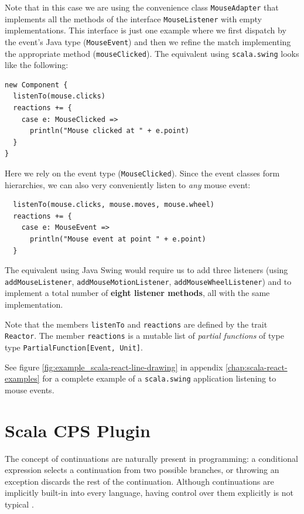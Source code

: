 Note that in this case we are using the convenience class \texttt{Mouse\-Adapter} that implements all the methods of the interface \texttt{Mouse\-Listener} with empty implementations. This interface is just one example where we first dispatch by the event's Java type (\texttt{MouseEvent}) and then we refine the match implementing the appropriate method (\texttt{mouseClicked}). The equivalent using \texttt{scala.swing} looks like the following:
\begin{lstlisting}
new Component {
  listenTo(mouse.clicks)
  reactions += {
    case e: MouseClicked =>
      println("Mouse clicked at " + e.point)
  }
}
\end{lstlisting}

Here we rely on the event type (\texttt{MouseClicked}). Since the event classes form hierarchies, we can also very conveniently listen to \emph{any} mouse event:
\begin{lstlisting}
  listenTo(mouse.clicks, mouse.moves, mouse.wheel)
  reactions += {
    case e: MouseEvent =>
      println("Mouse event at point " + e.point)
  }
\end{lstlisting}

The equivalent using Java Swing would require us to add three listeners (using \texttt{add\-Mouse\-Listener}, \texttt{add\-Mouse\-Motion\-Listener}, \texttt{add\-Mouse\-Wheel\-Listener}) and to implement a total number of \textbf{eight listener methods}, all with the same implementation.

Note that the members \texttt{listenTo} and \texttt{reactions} are defined by the trait \texttt{Reactor}. The member \texttt{reactions} is a mutable list of \emph{partial functions} of type type \texttt{PartialFunction[Event, Unit]}.

See figure \ref{fig:example_scala-react-line-drawing} in appendix \ref{chap:scala-react-examples} for a complete example of a \texttt{scala.swing} application listening to mouse events.

\section{Scala CPS Plugin}\label{sec:theory_scala-cps-plugin}

The concept of continuations are naturally present in programming: a conditional expression selects a continuation from two possible branches, or throwing an exception discards the rest of the continuation. Although continuations are implicitly built-in into every language, having control over them explicitly is not typical \cite{Asai11introductionto}.

